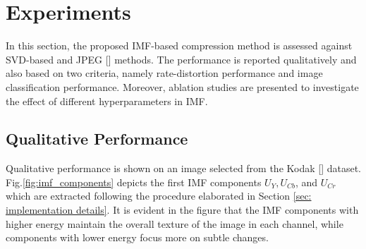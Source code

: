\section{Experiments} \label{sec: experiments}

In this section, the proposed IMF-based compression method is assessed against SVD-based and JPEG [] methods.
The performance is reported qualitatively and also based on two criteria, namely rate-distortion performance and image classification performance.
Moreover, ablation studies are presented to investigate the effect of different hyperparameters in IMF.

\subsection{Qualitative Performance}
Qualitative performance is shown on an image selected from the Kodak [] dataset. 
Fig.\ref{fig:imf_components} depicts the first IMF components $U_{Y}, U_{Cb}$, and $U_{Cr}$ which are extracted following the procedure elaborated in Section \ref{sec: implementation details}. It is evident in the figure that the IMF components with higher energy maintain the overall texture of the image in each channel, while components with lower energy focus more on subtle changes. 

